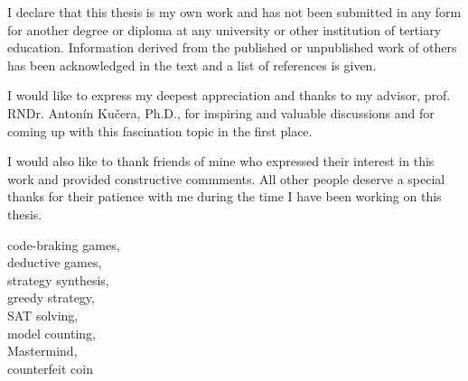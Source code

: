 

{}








\FrontMatter
\setlength{\parindent}{0pt}
\ThesisTitlePage


\begin{ThesisDeclaration}
I declare that this thesis is my own work and has not been submitted
in any form for another degree or diploma at any university or
other institution of tertiary education. Information derived from the published
or unpublished work of others has been acknowledged in the text
and a list of references is given.

\AdvisorName
\end{ThesisDeclaration}


\begin{ThesisThanks}
I would like to express my deepest appreciation and thanks to my advisor,
  prof. RNDr. Antonín Kučera, Ph.D.,
  for inspiring and valuable discussions and
  for coming up with this fascination topic in the first place.

I would also like to thank friends of mine who
  expressed their interest in this work and provided
  constructive commments.
All other people deserve a special thanks for their patience with me
 during the time I have been working on this thesis.
\end{ThesisThanks}


\begin{ThesisKeyWords}
code-braking games, \\
deductive games,\\
strategy synthesis, \\
greedy strategy,\\
SAT solving,\\
model counting, \\
Mastermind, \\
counterfeit coin\\
\end{ThesisKeyWords}


